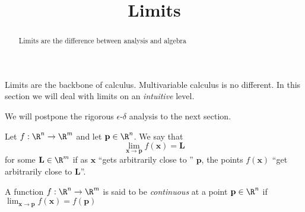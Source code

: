 \documentclass{ximera}
\title{Limits}
\begin{document}
\begin{abstract}
	Limits are the difference between analysis and algebra
\end{abstract}
\maketitle

Limits are the backbone of calculus.  Multivariable calculus is no different.  In this section we will deal with limits on an \textit{intuitive} level.

We will postpone the rigorous $\epsilon$-$\delta$ analysis to the next section.
\begin{definition}
Let $f: \R^n \to \R^m$ and let $\mathbf{p} \in \R^n$.  We say that \[\displaystyle\lim_{\mathbf{x} \to \mathbf{p}} f(\mathbf{x}) = \mathbf{L}\] for some $\mathbf{L} \in \R^m$ 
if as $\mathbf{x}$ ``gets arbitrarily close to '' $\mathbf{p}$, the points $f(\mathbf{x})$ ``get arbitrarily close to $\mathbf{L}$''.  
	\end{definition}
	
	
	
	\begin{definition}
		A function $f: \R^n \to \R^m$ is said to be \textit{continuous} at a point $\mathbf{p} \in \R^n$ if \(\displaystyle\lim_{\mathbf{x} \to \mathbf{p}} f(\mathbf{x}) = f(\mathbf{p})\)
	\end{definition}
	
\end{document}
